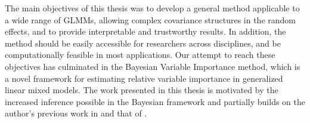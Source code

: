 The main objectives of this thesis was to develop a general method applicable to a wide range of GLMMs, allowing complex covariance structures in the random effects, and to provide interpretable and trustworthy results. In addition, the method should be easily accessible for researchers across disciplines, and be computationally feasible in most applications. Our attempt to reach these objectives has culminated in the Bayesian Variable Importance method, which is a novel framework for estimating relative variable importance in generalized linear mixed models. The work presented in this thesis is motivated by the increased inference possible in the Bayesian framework and partially builds on the author's previous work in \citet{Arnstad:Relative_variable_importance_in_Bayesian_linear_mixed_models:2024} and that of \citet{matre}.
\\
\\

